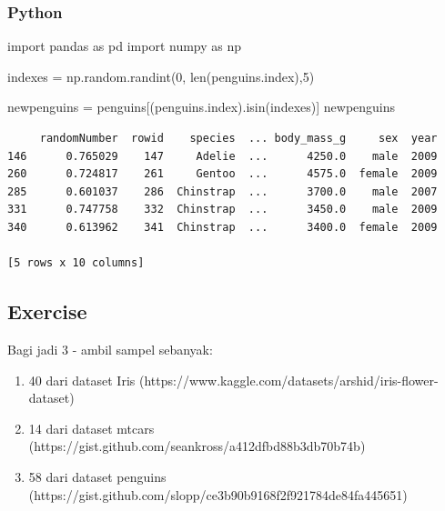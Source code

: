 \documentclass[
  letterpaper,
  DIV=11,
  numbers=noendperiod]{scrreprt}
\newenvironment{Shaded}{\begin{snugshade}}{\end{snugshade}}
\newcommand{\BuiltInTok}[1]{\textcolor[rgb]{0.00,0.23,0.31}{#1}}
\newcommand{\DecValTok}[1]{\textcolor[rgb]{0.68,0.00,0.00}{#1}}
\newcommand{\ImportTok}[1]{\textcolor[rgb]{0.00,0.46,0.62}{#1}}
\newcommand{\NormalTok}[1]{\textcolor[rgb]{0.00,0.23,0.31}{#1}}
\newcommand{\OperatorTok}[1]{\textcolor[rgb]{0.37,0.37,0.37}{#1}}
\providecommand{\tightlist}{%
  \setlength{\itemsep}{0pt}\setlength{\parskip}{0pt}}\usepackage{longtable,booktabs,array}
\begin{document}
\hypertarget{python-4}{%
\subsubsection{Python}\label{python-4}}

\begin{Shaded}
\begin{Highlighting}[]
\ImportTok{import}\NormalTok{ pandas }\ImportTok{as}\NormalTok{ pd}
\ImportTok{import}\NormalTok{ numpy }\ImportTok{as}\NormalTok{ np}

\NormalTok{indexes }\OperatorTok{=}\NormalTok{ np.random.randint(}\DecValTok{0}\NormalTok{, }\BuiltInTok{len}\NormalTok{(penguins.index),}\DecValTok{5}\NormalTok{)}

\NormalTok{newpenguins }\OperatorTok{=}\NormalTok{ penguins[(penguins.index).isin(indexes)]}
\NormalTok{newpenguins}
\end{Highlighting}
\end{Shaded}

\begin{verbatim}
     randomNumber  rowid    species  ... body_mass_g     sex  year
146      0.765029    147     Adelie  ...      4250.0    male  2009
260      0.724817    261     Gentoo  ...      4575.0  female  2009
285      0.601037    286  Chinstrap  ...      3700.0    male  2007
331      0.747758    332  Chinstrap  ...      3450.0    male  2009
340      0.613962    341  Chinstrap  ...      3400.0  female  2009

[5 rows x 10 columns]
\end{verbatim}

\hypertarget{exercise-2}{%
\subsection{Exercise}\label{exercise-2}}

Bagi jadi 3 - ambil sampel sebanyak:

\begin{enumerate}
\def\labelenumi{\arabic{enumi}.}
\tightlist
\item
  40 dari dataset Iris
  (https://www.kaggle.com/datasets/arshid/iris-flower-dataset)
\item
  14 dari dataset mtcars
  (https://gist.github.com/seankross/a412dfbd88b3db70b74b)
\item
  58 dari dataset penguins
  (https://gist.github.com/slopp/ce3b90b9168f2f921784de84fa445651)
\end{enumerate}
\end{document}
